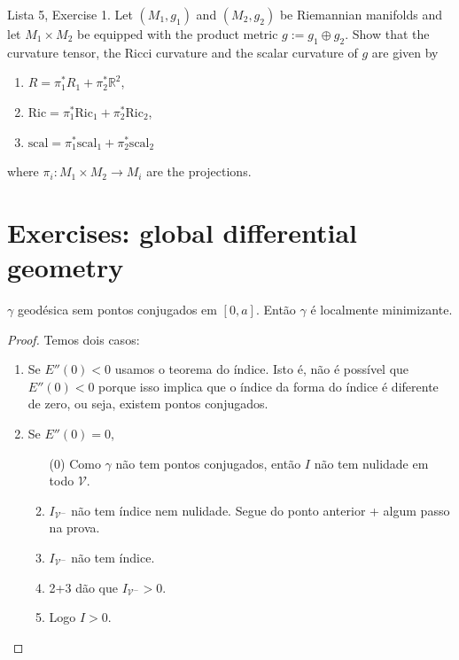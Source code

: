 \begin{exercise}
\label{exercise-curvatures-in-product}
Lista 5, Exercise 1. Let $(M_1,g_1)$ and $(M_2,g_2)$ be Riemannian manifolds and
let $M_1\times M_2$ be equipped with the product metric $g:=g_1\oplus g_2$. Show
that the curvature tensor, the Ricci curvature and the scalar curvature of $g$
are given by
\begin{enumerate}
\item $R=\pi_1^*R_1+\pi_2^*\mathbb{R}^2$,
\item $\text{Ric}=\pi_1^*\text{Ric}_1+\pi_2^*\text{Ric}_2$,
\item $\text{scal}=\pi_1^*\text{scal}_1+\pi_2^*\text{scal}_2$
\end{enumerate}
where $\pi_i:M_1\times M_2\to M_i$ are the projections.
\end{exercise}

\section{Exercises: global differential geometry}
\label{section-exercises-global-differential-geometry}

\begin{exercise}
\label{exercise-geodesica-sem-pontos-conjugados-e-localmente-minimizante}
$\gamma$ geodésica sem pontos conjugados em $[0,a]$. Então $\gamma$ é localmente
minimizante.
\end{exercise}

\begin{proof}
Temos dois casos:
\begin{enumerate}
\item Se $E''(0)<0$ usamos o teorema do índice. Isto é, não é possível que
 $E''(0)<0$ porque isso implica que o índice da forma do índice é diferente
 de zero, ou seja, existem pontos conjugados.
\item Se $E''(0)=0$,
\begin{enumerate}
\item[(0)] Como $\gamma$ não tem pontos conjugados, então $I$ não tem
nulidade em todo  $\mathcal{V}$.
\item $I_{\mathcal{V}^-}$ não tem índice nem nulidade. Segue do ponto anterior + 
algum passo na prova.
\item $I_{\mathcal{V}^-}$ não tem índice.
\item 2+3 dão que $I_{\mathcal{V}^-}>0$.
\item Logo $I>0$.
\end{enumerate}
\end{enumerate}
\end{proof}


